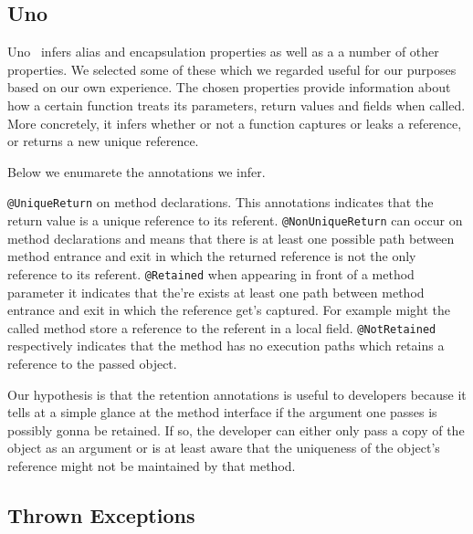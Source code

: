 

\subsection{Uno}

Uno~\cite{Uno} infers alias and encapsulation properties as well as a a number
of other properties. We selected some of these which we regarded useful for our
purposes based on our own experience. The chosen properties 
provide information about how a certain function treats its parameters, return 
values and fields when called. More concretely, it infers whether or not a 
function captures or leaks a reference, or returns a new unique reference.

Below we enumarete the annotations we infer.

\texttt{@UniqueReturn} on method declarations. This annotations indicates 
that the return value is a unique reference to its referent.
\texttt{@NonUniqueReturn} can occur on method declarations and means that 
there is at least one possible path between method entrance and exit in
which the returned reference is not the only reference to its referent.
\texttt{@Retained} when appearing in front of a method parameter it indicates
that the're exists at least one path between method entrance and exit in 
which the reference get's captured. For example might the called method store
a reference to the referent in a local field.
\texttt{@NotRetained} respectively indicates that the method has no execution 
paths which retains a reference to the passed object.

Our hypothesis is that the retention annotations is useful to developers
because it tells at a simple glance at the method interface if the argument
one passes is possibly gonna be retained. If so, the developer can either only
pass a copy of the object as an argument or is at least aware that the uniqueness
of the object's reference might not be maintained by that method.

\subsection{Thrown Exceptions}

